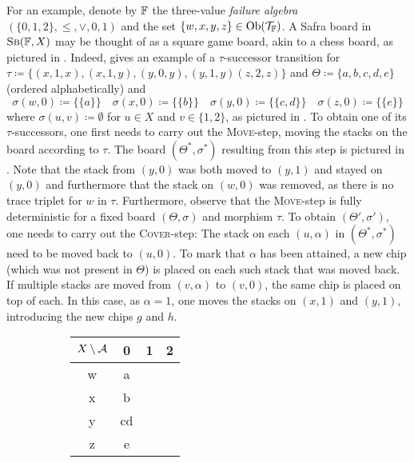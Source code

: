\begin{example}\label{ex:t-succ}
  For an example, denote by $\mathbb{F}$ the three-value \textit{failure algebra}
   $(\{0, 1, 2\}, \leq, \vee, 0, 1)$ and the set
  $\{w, x, y, z\} \in \mathrm{Ob}(\mathcal{T}_{\mathbb{F}})$. A Safra board in $\textsc{Sb}(\mathbb{F}, X)$ may be
  thought of as a square game board, akin to a chess board, as pictured in
  . Indeed,  gives an example of a
  $\tau$-successor transition for $\tau \coloneq \{(x, 1, x), (x, 1, y), (y, 0, y), (y, 1, y) (z, 2,
  z)\}$ and $\Theta \coloneq \{a, b, c, d, e\}$ (ordered alphabetically) and
  \[\sigma(w, 0) \coloneq \{\{a\}\} \quad
    \sigma(x, 0) \coloneq \{\{b\}\} \quad
    \sigma(y, 0) \coloneq \{\{c, d\}\} \quad
    \sigma(z, 0) \coloneq \{\{e\}\}
  \]
  where $\sigma(u, v) \coloneq \emptyset$ for $u \in X$ and $v \in \{1, 2\}$, as
  pictured in . To obtain one of its $\tau$-successors, one
  first needs to carry out the \textsc{Move}-step, moving the stacks on the
  board according to $\tau$. The board $(\Theta^*, \sigma^*)$ resulting from
  this step is pictured in . Note that the stack from $(y,
  0)$ was both moved to $(y, 1)$ and stayed on $(y, 0)$ and furthermore that the stack on $(w, 0)$
  was removed, as there is no trace triplet for $w$ in $\tau$. Furthermore,
  observe that the \textsc{Move}-step is fully deterministic for a fixed board
  $(\Theta, \sigma)$ and morphism $\tau$. To obtain $(\Theta', \sigma')$, one
  needs to carry out the \textsc{Cover}-step: The stack on each $(u, \alpha)$ in
  $(\Theta^*, \sigma^*)$ need to be moved back to $(u, 0)$. To mark that
  $\alpha$ has been attained, a new chip (which was not present in $\Theta$) is
  placed on each such stack that was moved back. If multiple stacks are moved
  from $(v, \alpha)$ to $(v, 0)$, the same chip is placed on top of each.
  In this case, as $\alpha = 1$, one moves the stacks on $(x, 1)$ and $(y, 1)$,
  introducing the new chips $g$ and $h$.
  \begin{figure}[h]
    \centering
    \begin{subfigure}[b]{0.3\textwidth}
      \centering
      \begin{tabular}{|c|c|c|c|}
        \hline
        $X \setminus \mathcal{A}$& 0 & 1 & 2 \\
        \hline
        w & a & & \\
        \hline
        x & b & & \\
        \hline
        y & cd & & \\
        \hline
        z & e & & \\

\end{tabular}
\end{subfigure}
\end{figure}
\end{example}
